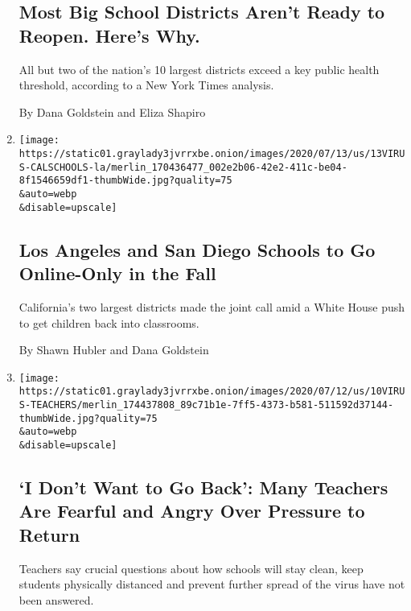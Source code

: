 \begin{enumerate}
{  \subsection{Most Big School Districts Aren't Ready to Reopen. Here's
  Why.}\label{most-big-school-districts-arent-ready-to-reopen-heres-why}}

  All but two of the nation's 10 largest districts exceed a key public
  health threshold, according to a New York Times analysis.

  By Dana Goldstein and Eliza Shapiro
\item
  \href{/2020/07/13/us/lausd-san-diego-school-reopening.html}{}

  \texttt{[image: https://static01.graylady3jvrrxbe.onion/images/2020/07/13/us/13VIRUS-CALSCHOOLS-la/merlin\_170436477\_002e2b06-42e2-411c-be04-8f1546659df1-thumbWide.jpg?quality=75\\\&auto=webp\\\&disable=upscale]}

  \hypertarget{los-angeles-and-san-diego-schools-to-go-online-only-in-the-fall}{%
  \subsection{Los Angeles and San Diego Schools to Go Online-Only in the
  Fall}\label{los-angeles-and-san-diego-schools-to-go-online-only-in-the-fall}}

  California's two largest districts made the joint call amid a White
  House push to get children back into classrooms.

  By Shawn Hubler and Dana Goldstein
\item
  \href{/2020/07/11/us/virus-teachers-classrooms.html}{}

  \texttt{[image: https://static01.graylady3jvrrxbe.onion/images/2020/07/12/us/10VIRUS-TEACHERS/merlin\_174437808\_89c71b1e-7ff5-4373-b581-511592d37144-thumbWide.jpg?quality=75\\\&auto=webp\\\&disable=upscale]}

  \hypertarget{i-dont-want-to-go-back-many-teachers-are-fearful-and-angry-over-pressure-to-return}{%
  \subsection{`I Don't Want to Go Back': Many Teachers Are Fearful and
  Angry Over Pressure to
  Return}\label{i-dont-want-to-go-back-many-teachers-are-fearful-and-angry-over-pressure-to-return}}

  Teachers say crucial questions about how schools will stay clean, keep
  students physically distanced and prevent further spread of the virus
  have not been answered.


\end{enumerate}
